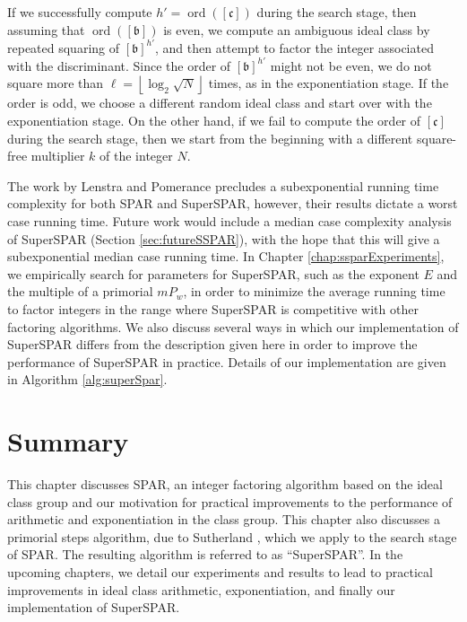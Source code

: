 \documentclass{ucalgthes1}
\theoremstyle{definition}
\DeclareMathOperator{\ord}{ord}
\newcommand{\floor}[1]{\left\lfloor #1 \right\rfloor}
\newcommand{\ideal}{\mathfrak}
\newcommand{\idealclass}[1]{\left[ \ideal #1 \right]}
\newcommand{\bclass}{\idealclass b}
\newcommand{\cclass}{\idealclass c}
\begin{document}
If we successfully compute $h' = \ord(\cclass)$ during the search stage, then assuming that $\ord(\bclass)$ is even, we compute an ambiguous ideal class by repeated squaring of $\bclass^{h'}$, and then attempt to factor the integer associated with the discriminant.  Since the order of $\bclass^{h'}$ might not be even, we do not square more than $\ell = \floor{\log_2{\sqrt N}}$ times, as in the exponentiation stage.  If the order is odd, we choose a different random ideal class and start over with the exponentiation stage.  On the other hand, if we fail to compute the order of $\cclass$ during the search stage, then we start from the beginning with a different square-free multiplier $k$ of the integer $N$.

The work by Lenstra and Pomerance \cite[\S 11]{Lenstra1992} precludes a subexponential running time complexity for both SPAR and SuperSPAR, however, their results dictate a worst case running time.  Future work would include a median case complexity analysis of SuperSPAR (Section \ref{sec:futureSSPAR}), with the hope that this will give a subexponential median case running time.  In Chapter \ref{chap:ssparExperiments}, we empirically search for parameters for SuperSPAR, such as the exponent $E$ and the multiple of a primorial $mP_w$, in order to minimize the average running time to factor integers in the range where SuperSPAR is competitive with other factoring algorithms.  We also discuss several ways in which our implementation of SuperSPAR differs from the description given here in order to improve the performance of SuperSPAR in practice.  Details of our implementation are given in Algorithm \ref{alg:superSpar}.

\section{Summary}

This chapter discusses SPAR, an integer factoring algorithm based on the ideal class group and our motivation for practical improvements to the performance of arithmetic and exponentiation in the class group.  This chapter also discusses a primorial steps algorithm, due to Sutherland \cite{Sutherland2007}, which we apply to the search stage of SPAR.   The resulting algorithm is referred to as ``SuperSPAR''.   In the upcoming chapters, we detail our experiments and results to lead to practical improvements in ideal class arithmetic, exponentiation, and finally our implementation of SuperSPAR.


\end{document}
